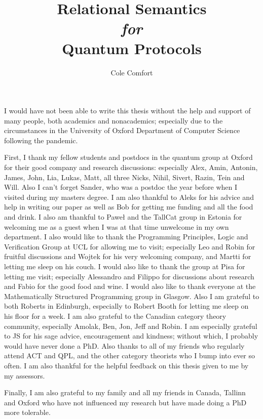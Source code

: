 \documentclass[12pt]{ociamthesis}  %
\title{Relational Semantics \\{ \it \Large for}\\ Quantum Protocols}
\author{Cole Comfort}
\begin{document}
\maketitle



\begin{acknowledgements}

I would have not been able to write this thesis without the help and support of many people, both academics and nonacademics;  especially due to the circumstances in the University of  Oxford Department of Computer Science following the pandemic.

First, I thank my fellow students and postdocs in the quantum group at  Oxford for their good company and research discussions: especially Alex,  Amin, Antonin, James, John, Lia, Lukas, Matt, all three Nicks, Nihil, Sivert, Razin, Tein and Will.  Also I can't forget Sander, who was a postdoc the year before when I visited during my masters degree.
I am also thankful to Aleks for his advice and help in writing our paper as well as Bob for getting me funding and all the  food and drink.
I also am thankful to Pawe\l{} and the TallCat group in Estonia for welcoming me as a guest when I was at that time unwelcome in my own department.  I also would like to thank the Programming Principles, Logic and Verification Group at UCL for allowing me to visit; especially Leo and Robin for fruitful discussions and Wojtek for his very welcoming company, and Martti for letting me sleep on his couch. I would also like to thank the group at Pisa for letting me visit; especially Alessandro and Filippo for discussions about research and Fabio for the good food and wine. I would also like to thank everyone at the Mathematically Structured Programming group in Glasgow.  Also I am grateful to both Roberts in Edinburgh, especially to Robert Booth for letting me sleep on his floor for a week.
I am also grateful to the Canadian category theory community, especially Amolak, Ben, Jon, Jeff and Robin.  I am especially grateful to JS for his sage advice, encouragement and kindness; without which, I probably would have never done a PhD.  Also thanks to all of my friends who regularly attend ACT and QPL, and the other category theorists who I bump into ever so often.  I am also thankful for the helpful feedback on this thesis given to me by my assessors.

Finally, I am also grateful to my family and all my friends in Canada, Tallinn and Oxford who have not influenced my research but have made doing a PhD more tolerable.
\end{acknowledgements}
\end{document}
